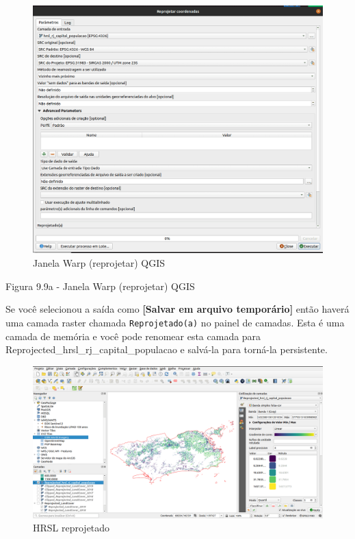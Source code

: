 \documentclass[
]{krantz}
\begin{document}
\begin{figure}
\centering
\includegraphics{media/modulo9/fig99_a.png}
\caption{Janela Warp (reprojetar) QGIS}
\end{figure}

Figura 9.9a - Janela Warp (reprojetar) QGIS

Se você selecionou a saída como \textbf{{[}Salvar em arquivo temporário{]}} então haverá uma camada raster chamada \texttt{Reprojetado(a)} no painel de camadas. Esta é uma camada de memória e você pode renomear esta camada para Reprojected\_hrsl\_rj\_capital\_populacao e salvá-la para torná-la persistente.

\begin{figure}
\centering
\includegraphics{media/modulo9/fig99_b.png}
\caption{HRSL reprojetado}
\end{figure}
\end{document}
